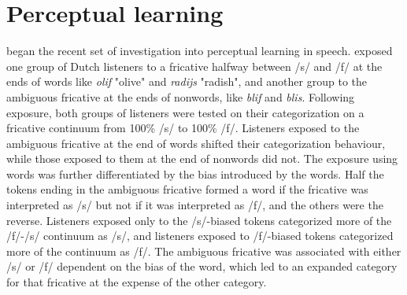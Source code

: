\section{Perceptual learning}
\label{sec:perceptuallearning}


\citet{Norris2003} began the recent set of investigation into perceptual learning in speech.
\citet{Norris2003} exposed one group of Dutch listeners to a fricative halfway between /s/ and /f/ at the ends of words like \emph{olif} "olive" and \emph{radijs} "radish", and another group to the ambiguous fricative at the ends of nonwords, like \emph{blif} and \emph{blis}.
Following exposure, both groups of listeners were tested on their categorization on a fricative continuum from 100\% /s/ to 100\% /f/. 
Listeners exposed to the ambiguous fricative at the end of words shifted their categorization behaviour, while those exposed to them at the end of nonwords did not.  The exposure using words was further differentiated by the bias introduced by the words.  
Half the tokens ending in the ambiguous fricative formed a word if the fricative was interpreted as /s/ but not if it was interpreted as /f/, and the others were the reverse.  
Listeners exposed only to the /s/-biased tokens categorized more of the /f/-/s/ continuum as /s/, and listeners exposed to /f/-biased tokens categorized more of the continuum as /f/.  
The ambiguous fricative was associated with either /s/ or /f/ dependent on the bias of the word, which led to an expanded category for that fricative at the expense of the other category.

